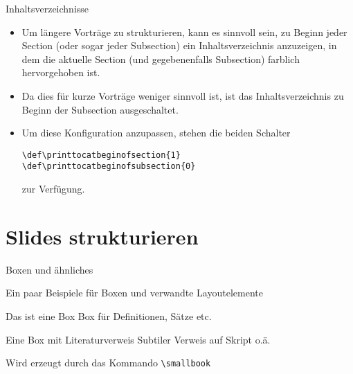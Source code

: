 \documentclass[hyperref={bookmarks=false},11pt,dvipsnames]{beamer}
\begin{document}
\begin{frame}[t]{Inhaltsverzeichnisse}
	\begin{itemize}
		\item Um längere Vorträge zu strukturieren, kann es sinnvoll sein, zu Beginn jeder Section (oder sogar jeder Subsection) ein Inhaltsverzeichnis anzuzeigen, in dem die aktuelle Section (und gegebenenfalls Subsection) farblich hervorgehoben ist.

		\item Da dies für kurze Vorträge weniger sinnvoll ist, ist das Inhaltsverzeichnis zu Beginn der Subsection ausgeschaltet.

		\item Um diese Konfiguration anzupassen, stehen die beiden Schalter
		      \begin{alltt}
			      \textbackslash{}def\textbackslash{}printtocatbeginofsection\{1\}\\
			      \textbackslash{}def\textbackslash{}printtocatbeginofsubsection\{0\}
		      \end{alltt}
		      zur Verfügung.
	\end{itemize}

\end{frame}


\section{Slides strukturieren}

\begin{frame}[t]{Boxen und ähnliches}

	Ein paar Beispiele für Boxen und verwandte Layoutelemente

	\vspace{.5cm}
	\begin{beamerboxesrounded}{Das ist eine Box}
		Box für Definitionen, Sätze etc.
	\end{beamerboxesrounded}

	\vspace{.5cm}
	\begin{beamerboxesrounded}{Eine Box mit Literaturverweis \smallbook}
		Subtiler Verweis auf Skript o.ä.

		Wird erzeugt durch das Kommando \texttt{\textbackslash{}smallbook}
	\end{beamerboxesrounded}

	\vspace{.5cm}

\end{frame}
\end{document}
